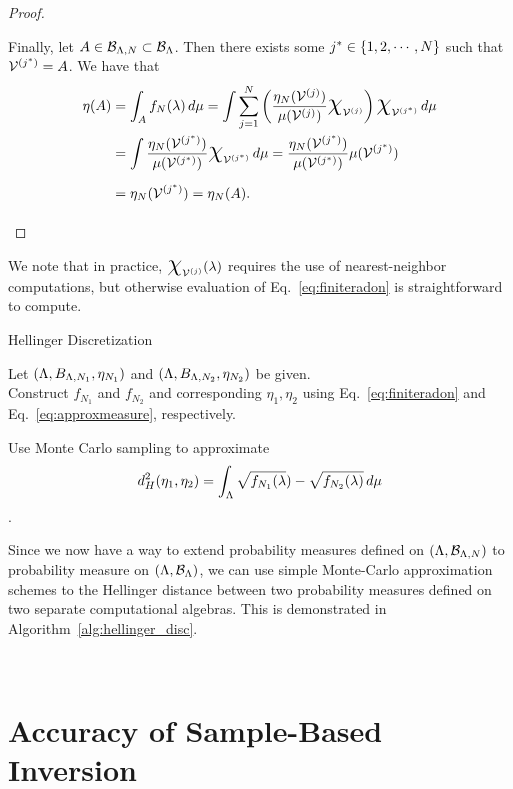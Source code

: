 \begin{proof}
\begin{itemize}
\noindent Finally, let $A\in\mathcal{B}_{{\Lambda}, N}\subset \mathcal{B}_{\Lambda}$. 
Then there exists some $j^* \in \left\{1,2, \cdots, N\right\}$ such that $\mathcal{V}^{(j^*)} = A$. 
We have that
\begin{equation*}
\begin{split}
\eta (A) &= \int_A f_N (\param) \, d\mu
=  \int \sum_{j=1}^{N} \left ( \frac{\eta_N (\VV^{(j)}) }{\mu (\VV^{(j)})} \Chi_{\VV^{(j)}}\right ) \Chi_{\VV^{(j^*)}} \, d\mu \\
&= \int \frac{\eta_N (\VV^{(j^*)}) }{\mu (\VV^{(j^*)})} \Chi_{\VV^{(j^*)}} \, d\mu
= \frac{\eta_N (\VV^{(j^*)}) }{\mu (\VV^{(j^*)})} \mu (\VV^{(j^*)}) \\
&= \eta_N (\VV^{(j^*)}) = \eta_N (A). 
\end{split}
\end{equation*}

\end{itemize}
\end{proof}

We note that in practice, $\Chi_{\VV^{(j)}} (\param)$ requires the use of nearest-neighbor computations, but otherwise evaluation of Eq.~\eqref{eq:finiteradon} is straightforward to compute.

\begin{algorithm}
\DontPrintSemicolon
\caption{Hellinger Discretization}
\label{alg:hellinger_disc}
Let $({\Lambda}, B_{{\Lambda}, N_1}, \eta_{N_1} )$ and $({\Lambda}, B_{{\Lambda}, N_2}, \eta_{N_2} )$ be given.\\
 
Construct $f_{N_1}$ and $f_{N_2}$ and corresponding $\eta_1, \eta_2$ using Eq.~\eqref{eq:finiteradon} and Eq.~\eqref{eq:approxmeasure}, respectively.

Use Monte Carlo sampling to approximate
$$ d^2_H(\eta_1, \eta_2) = \int_{\Lambda} \sqrt{f_{N_1}(\lambda}) - \sqrt{f_{N_2}(\lambda)} \, d\mu $$.
\end{algorithm}

Since we now have a way to extend probability measures defined on $({\Lambda}, \mathcal{B}_{{\Lambda}, N})$ to  probability measure on $({\Lambda}, \mathcal{B}_{{\Lambda}})$, we can use simple Monte-Carlo approximation schemes to the Hellinger distance between two probability measures defined on two separate computational algebras. 
This is demonstrated in Algorithm~\ref{alg:hellinger_disc}.





\
\section{Accuracy of Sample-Based Inversion}\label{sec:ch03-sample}


